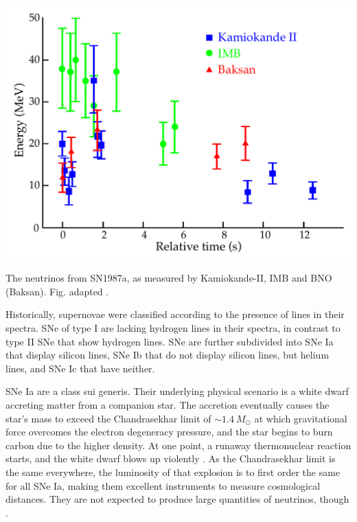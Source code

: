 \documentclass[
    a4paper, %
    fontsize=10pt, %
    twoside=false, %
    numbers=noenddot, %
    fontmethod=tex,
]{kaobook}
\begin{document}
\begin{marginfigure}
    \includegraphics{theory/sn1987a_flux.pdf}
    \caption[Neutrinos from SN1987a]{The neutrinos from SN1987a, as measured by Kamiokande-II, IMB and BNO (Baksan). Fig. adapted \cite{Grupen2005}.}
\end{marginfigure}


Historically, supernovae were classified according to the presence of lines in their spectra. SNe of type I are lacking hydrogen lines in their spectra, in contrast to type II SNe that show hydrogen lines. SNe are further subdivided into SNe Ia that display silicon lines, SNe Ib that do not display silicon lines, but helium lines, and SNe Ic that have neither.

SNe Ia are a class sui generis. Their underlying physical scenario is a white dwarf accreting matter from a companion star. The accretion eventually causes the star's mass to exceed the Chandrasekhar limit of $\sim 1.4~M_\odot$ at which gravitational force overcomes the electron degeneracy pressure, and the star begins to burn carbon due to the higher density. At one point, a runaway thermonuclear reaction starts, and the white dwarf blows up violently . As the Chandrasekhar limit is the same everywhere, the luminosity of that explosion is to first order the same for all SNe Ia, making them excellent instruments to measure cosmological distances. They are not expected to produce large quantities of neutrinos, though .
\end{document}
